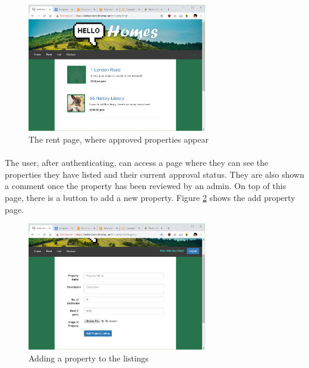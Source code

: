 \documentclass{article}
\begin{document}
            \begin{figure}[!htb]
                \centering
                \includegraphics[width=0.7\textwidth]{figures/rent.png}
                \caption[Rent Page]{The rent page, where approved properties appear}
                \label{fig:rent_page}
            \end{figure}

        \paragraph{}
            The user, after authenticating, can access a page where they can see the properties they have listed and their current approval status.
            They are also shown a comment once the property has been reviewed by an admin.
            On top of this page, there is a button to add a new property.
            Figure \ref{fig:add_property} shows the add property page.

            \begin{figure}[!htb]
                \centering
                \includegraphics[width=0.7\textwidth]{figures/add_property.png}
                \caption[Add Property]{Adding a property to the listings}
                \label{fig:add_property}
            \end{figure}
\end{document}
